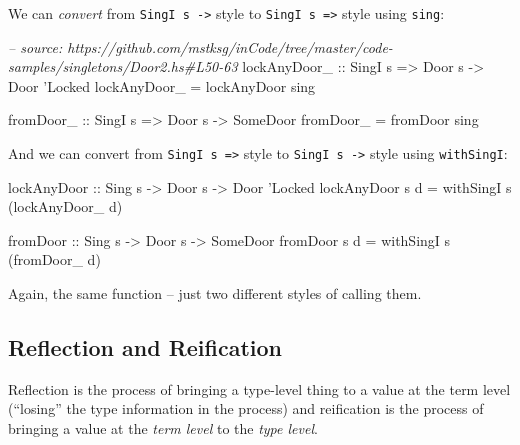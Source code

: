 \documentclass[]{article}
\newenvironment{Shaded}{}{}
\newcommand{\DataTypeTok}[1]{\textcolor[rgb]{0.56,0.13,0.00}{#1}}
\newcommand{\CharTok}[1]{\textcolor[rgb]{0.25,0.44,0.63}{#1}}
\newcommand{\CommentTok}[1]{\textcolor[rgb]{0.38,0.63,0.69}{\textit{#1}}}
\newcommand{\OtherTok}[1]{\textcolor[rgb]{0.00,0.44,0.13}{#1}}
\newcommand{\FunctionTok}[1]{\textcolor[rgb]{0.02,0.16,0.49}{#1}}
\newcommand{\NormalTok}[1]{#1}
\begin{document}
We can \emph{convert} from \texttt{SingI\ s\ -\textgreater{}} style to
\texttt{SingI\ s\ =\textgreater{}} style using \texttt{sing}:

\begin{Shaded}
\begin{Highlighting}[]
\CommentTok{-- source: https://github.com/mstksg/inCode/tree/master/code-samples/singletons/Door2.hs#L50-63}
\OtherTok{lockAnyDoor_ ::} \DataTypeTok{SingI}\NormalTok{ s }\OtherTok{=>} \DataTypeTok{Door}\NormalTok{ s }\OtherTok{->} \DataTypeTok{Door} \CharTok{'Locked}
\NormalTok{lockAnyDoor_ }\FunctionTok{=}\NormalTok{ lockAnyDoor sing}

\OtherTok{fromDoor_ ::} \DataTypeTok{SingI}\NormalTok{ s }\OtherTok{=>} \DataTypeTok{Door}\NormalTok{ s }\OtherTok{->} \DataTypeTok{SomeDoor}
\NormalTok{fromDoor_ }\FunctionTok{=}\NormalTok{ fromDoor sing}
\end{Highlighting}
\end{Shaded}

And we can convert from \texttt{SingI\ s\ =\textgreater{}} style to
\texttt{SingI\ s\ -\textgreater{}} style using \texttt{withSingI}:

\begin{Shaded}
\begin{Highlighting}[]
\OtherTok{lockAnyDoor ::} \DataTypeTok{Sing}\NormalTok{ s }\OtherTok{->} \DataTypeTok{Door}\NormalTok{ s }\OtherTok{->} \DataTypeTok{Door} \CharTok{'Locked}
\NormalTok{lockAnyDoor s d }\FunctionTok{=}\NormalTok{ withSingI s (lockAnyDoor_ d)}

\OtherTok{fromDoor ::} \DataTypeTok{Sing}\NormalTok{ s }\OtherTok{->} \DataTypeTok{Door}\NormalTok{ s }\OtherTok{->} \DataTypeTok{SomeDoor}
\NormalTok{fromDoor s d }\FunctionTok{=}\NormalTok{ withSingI s (fromDoor_ d)}
\end{Highlighting}
\end{Shaded}

Again, the same function -- just two different styles of calling them.

\subsection{Reflection and Reification}\label{reflection-and-reification}

Reflection is the process of bringing a type-level thing to a value at the term
level (``losing'' the type information in the process) and reification is the
process of bringing a value at the \emph{term level} to the \emph{type level}.
\end{document}
